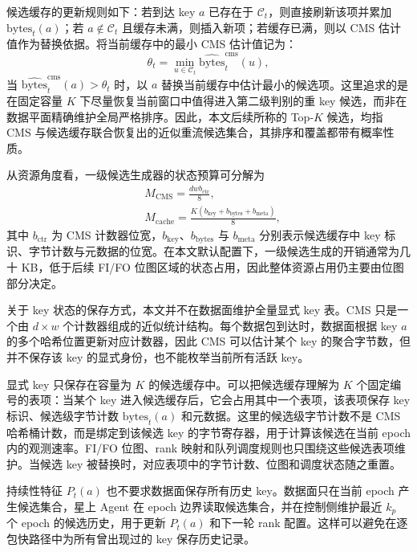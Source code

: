 候选缓存的更新规则如下：若到达 key $a$ 已存在于 $\mathcal{C}_t$，则直接刷新该项并累加 $\text{bytes}_t(a)$；若 $a\notin\mathcal{C}_t$ 且缓存未满，则插入新项；若缓存已满，则以 CMS 估计值作为替换依据。将当前缓存中的最小 CMS 估计值记为：
\begin{equation}
\theta_t=\min_{u\in\mathcal{C}_t}\widehat{\text{bytes}}^{\mathrm{cms}}_t(u),
\label{eq:cache_threshold}
\end{equation}
当 $\widehat{\text{bytes}}^{\mathrm{cms}}_t(a)>\theta_t$ 时，以 $a$ 替换当前缓存中估计最小的候选项。这里追求的是在固定容量 $K$ 下尽量恢复当前窗口中值得进入第二级判别的重 key 候选，而非在数据平面精确维护全局严格排序。因此，本文后续所称的 Top-$K$ 候选，均指 CMS 与候选缓存联合恢复出的近似重流候选集合，其排序和覆盖都带有概率性质。

从资源角度看，一级候选生成器的状态预算可分解为
\begin{subequations}\label{eq:stage1_budget}
\begin{align}
&M_{\mathrm{CMS}} = \frac{dwb_{\mathrm{ctr}}}{8},
\label{eq:stage1_budget_cms}\\[0.35em]
&M_{\mathrm{cache}} = \frac{K\left(b_{\mathrm{key}}+b_{\mathrm{bytes}}+b_{\mathrm{meta}}\right)}{8},
\label{eq:stage1_budget_cache}
\end{align}
\end{subequations}
其中 $b_{\mathrm{ctr}}$ 为 CMS 计数器位宽，$b_{\mathrm{key}}$、$b_{\mathrm{bytes}}$ 与 $b_{\mathrm{meta}}$ 分别表示候选缓存中 key 标识、字节计数与元数据的位宽。在本文默认配置下，一级候选生成的开销通常为几十 KB，低于后续 FI/FO 位图区域的状态占用，因此整体资源占用仍主要由位图部分决定。


关于 key 状态的保存方式，本文并不在数据面维护全量显式 key 表。CMS 只是一个由 $d\times w$ 个计数器组成的近似统计结构。每个数据包到达时，数据面根据 key $a$ 的多个哈希位置更新对应计数器，因此 CMS 可以估计某个 key 的聚合字节数，但并不保存该 key 的显式身份，也不能枚举当前所有活跃 key。

显式 key 只保存在容量为 $K$ 的候选缓存中。可以把候选缓存理解为 $K$ 个固定编号的表项：当某个 key 进入候选缓存后，它会占用其中一个表项，该表项保存 key 标识、候选级字节计数 $\text{bytes}_t(a)$ 和元数据。这里的候选级字节计数不是 CMS 哈希桶计数，而是绑定到该候选 key 的字节寄存器，用于计算该候选在当前 epoch 内的观测速率。FI/FO 位图、rank 映射和队列调度规则也只围绕这些候选表项维护。当候选 key 被替换时，对应表项中的字节计数、位图和调度状态随之重置。

持续性特征 $P_t(a)$ 也不要求数据面保存所有历史 key。数据面只在当前 epoch 产生候选集合，星上 Agent 在 epoch 边界读取候选集合，并在控制侧维护最近 $k_p$ 个 epoch 的候选历史，用于更新 $P_t(a)$ 和下一轮 rank 配置。这样可以避免在逐包快路径中为所有曾出现过的 key 保存历史记录。

